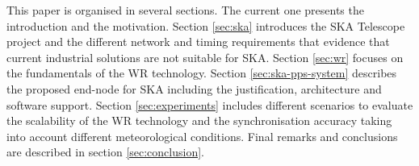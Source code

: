 This paper is organised in several sections. The current one presents the introduction and the motivation. Section \ref{sec:ska} introduces the SKA Telescope project and the different network and timing requirements that evidence that current industrial solutions are not suitable for SKA. Section \ref{sec:wr} focuses on the fundamentals of the WR technology. Section \ref{sec:ska-pps-system} describes the proposed end-node for SKA including the justification, architecture and software support. Section \ref{sec:experiments} includes different scenarios to evaluate the scalability of the WR technology and the synchronisation accuracy taking into account different meteorological conditions. Final remarks and conclusions are described in section \ref{sec:conclusion}. 